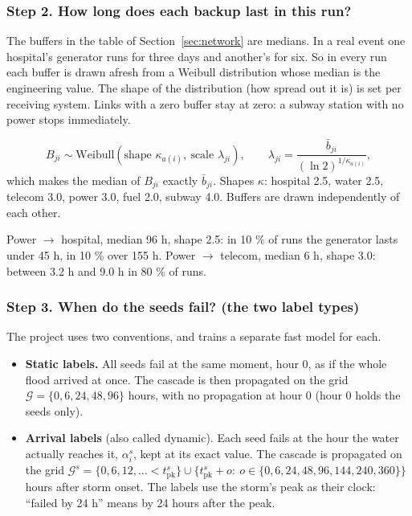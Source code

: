 \documentclass[11pt]{article}
\newcommand{\pk}{\mathrm{pk}}
\begin{document}
\subsubsection*{Step 2. How long does each backup last in this run?}

The buffers in the table of Section~\ref{sec:network} are medians. In a real event one hospital's generator runs for three days and another's for six. So in every run each buffer is drawn afresh from a Weibull distribution whose median is the engineering value. The shape of the distribution (how spread out it is) is set per receiving system. Links with a zero buffer stay at zero: a subway station with no power stops immediately.

\begin{maths}
\[
B_{ji}\sim\mathrm{Weibull}(\text{shape }\kappa_{a(i)},\ \text{scale }\lambda_{ji}),\qquad \lambda_{ji}=\frac{\bar b_{ji}}{(\ln 2)^{1/\kappa_{a(i)}}},
\]
which makes the median of $B_{ji}$ exactly $\bar b_{ji}$. Shapes $\kappa$: hospital 2.5, water 2.5, telecom 3.0, power 3.0, fuel 2.0, subway 4.0. Buffers are drawn independently of each other.
\end{maths}

\begin{example}
Power $\to$ hospital, median 96 h, shape 2.5: in 10 \% of runs the generator lasts under 45 h, in 10 \% over 155 h. Power $\to$ telecom, median 6 h, shape 3.0: between 3.2 h and 9.0 h in 80 \% of runs.
\end{example}

\subsubsection*{Step 3. When do the seeds fail? (the two label types)}

The project uses two conventions, and trains a separate fast model for each.

\begin{itemize}
\item \textbf{Static labels.} All seeds fail at the same moment, hour 0, as if the whole flood arrived at once. The cascade is then propagated on the grid $\mathcal G=\{0, 6, 24, 48, 96\}$ hours, with no propagation at hour 0 (hour 0 holds the seeds only).
\item \textbf{Arrival labels} (also called dynamic). Each seed fails at the hour the water actually reaches it, $\alpha_i^s$, kept at its exact value. The cascade is propagated on the grid $\mathcal G^s=\{0,6,12,\dots<t^s_{\pk}\}\cup\{t^s_{\pk}+o:\ o\in\{0,6,24,48,96,144,240,360\}\}$ hours after storm onset. The labels use the storm's peak as their clock: ``failed by 24 h'' means by 24 hours after the peak.
\end{itemize}
\end{document}
